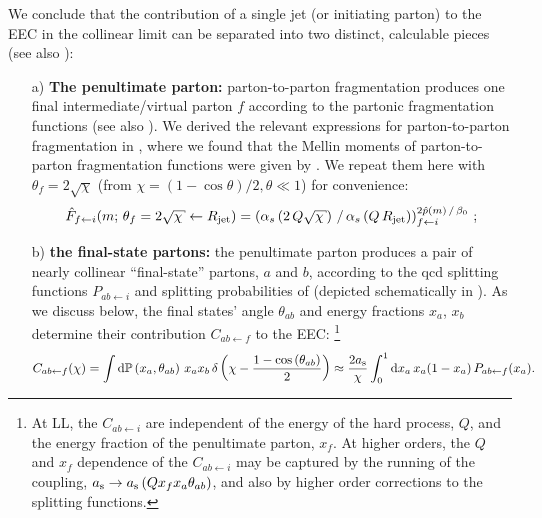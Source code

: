 We conclude that the contribution of a single jet (or initiating parton) to the EEC in the collinear limit can be separated into two distinct, calculable pieces (see also ):
\begin{enumerate}
    \item[a)]
    \textbf{The penultimate parton:}
    parton-to-parton fragmentation produces one final intermediate/virtual parton \(f\) according to the partonic fragmentation functions 
    (see also ).
    We derived the relevant expressions for parton-to-parton fragmentation in , where we found that the Mellin moments of parton-to-parton fragmentation functions were given by .
    We repeat them here with \(\theta_f = 2\sqrt{\chi}\) (from \(\chi = (1-\cos\theta)/2, \theta\ll1\)) for convenience:
    \begin{align}
        \hat{F}_{f \leftarrow i} (m;\,
        \theta_f = 2 \sqrt{\chi}\leftarrow \Rjet)
        =
        \le(
            \alpha_s\le(2\,Q\sqrt{\chi}\ri)
            \, / \,
            \alpha_s\le(Q\,\Rjet\ri)
        \ri)
        ^
        {2 \hat{p}(m) \, / \, \beta_0}
        _{f\leftarrow i}
        \,;
    \end{align}

    \item[b)]
    \textbf{the final-state partons:}
    the penultimate parton produces a pair of nearly collinear ``final-state'' partons, \(a\) and \(b\), according to the \gls{qcd} splitting functions \(P_{ab \leftarrow i}\) and splitting probabilities of 
    (depicted schematically in ).
    As we discuss below, the final states' angle \(\theta_{ab}\) and energy fractions \(x_a\), \(x_b\) determine their contribution \(C_{ab\leftarrow f}\) to the EEC:%
    \footnote{
        At LL, the \(C_{ab \leftarrow i}\) are independent of the energy of the hard process, \(Q\), and the energy fraction of the penultimate parton, \(x_f\).
        At higher orders, the \(Q\) and \(x_f\) dependence of the \(C_{ab \leftarrow i}\) may be captured by the running of the coupling, \(a_{\mathrm{s}} \to a_{\mathrm{s}}\left(Q x_f x_a \theta_{ab}\right)\), and also by higher order corrections to the splitting functions.
    }
    \begin{align}
        \label{eq:splitting_fn_contribution_to_eec}
        C_{ab\leftarrow f}(\chi)
        =
        \int \dd\mathbb{P}\le(x_a, \theta_{ab}\ri) \,
            x_a x_b
            \,
            \delta\le(\chi - \frac{1 - \cos\le(\theta_{ab}\ri)}{2}\ri)
        \approx
        \frac{2 \as}{\chi}
        \int_0^1 \dd x_a \, x_a (1-x_a) \,
        P_{ab \leftarrow f}(x_a)
        .
    \end{align}
\end{enumerate}

